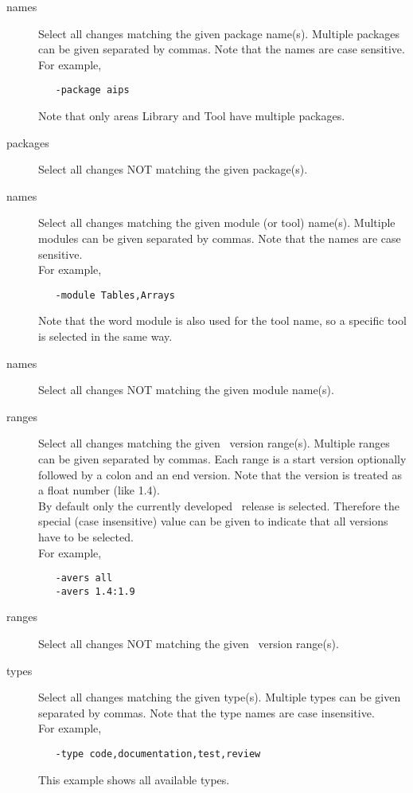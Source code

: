 \begin{description}
\item[ names]
   Select all changes matching the given package name(s).
   Multiple packages can be given separated by commas.
   Note that the names are case sensitive.
   \\For example,
\begin{verbatim}
   -package aips
\end{verbatim}
   Note that only areas Library and Tool have multiple packages.

\item[ packages]
   Select all changes NOT matching the given package(s).

\item[ names]
   Select all changes matching the given module (or tool) name(s).
   Multiple modules can be given separated by commas.
   Note that the names are case sensitive.
   \\For example,
\begin{verbatim}
   -module Tables,Arrays
\end{verbatim}
   Note that the word module is also used for the tool name, so
   a specific tool is selected in the same way.

\item[ names]
   Select all changes NOT matching the given module name(s).

\item[ ranges]
   Select all changes matching the given \aipspp\ version range(s).
   Multiple ranges can be given separated by commas.
   Each range is a start version optionally followed by a colon and an
   end version. 
   Note that the version is treated as a float number (like 1.4).
   \\By default only the currently developed \aipspp\ release is
   selected. Therefore the special (case insensitive) value
    can be given to indicate that all versions have to be selected.
   \\For example,
\begin{verbatim}
   -avers all
   -avers 1.4:1.9
\end{verbatim}

\item[ ranges]
   Select all changes NOT matching the given \aipspp\ version range(s).

\item[ types]
   Select all changes matching the given type(s).
   Multiple types can be given separated by commas.
   Note that the type names are case insensitive.
   \\For example,
\begin{verbatim}
   -type code,documentation,test,review
\end{verbatim}
   This example shows all available types.


\end{description}
